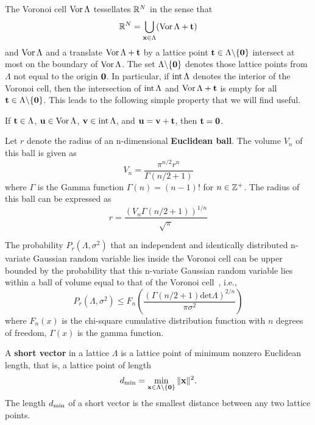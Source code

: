 The Voronoi cell $\operatorname{Vor}\Lambda$ tessellates ${\mathbb R}^N$ in the sense that
\[
{\mathbb R}^N = \bigcup_{\mathbf{x} \in \Lambda} (\operatorname{Vor}\Lambda + \mathbf{t})
\]
and $\operatorname{Vor}\Lambda$ and a translate $\operatorname{Vor}\Lambda + \mathbf{t}$ by a lattice point $\mathbf{t} \in \Lambda\backslash  \{\boldsymbol{0}\}$ intersect at most on the boundary of $\operatorname{Vor}\Lambda$.  The set $\Lambda \backslash  \{\boldsymbol{0}\}$ denotes those lattice points from $\Lambda$ not equal to the origin $\boldsymbol{0}$.  In particular, if $\operatorname{int}\Lambda$ denotes the interior of the Voronoi cell, then the intersection of $\operatorname{int}\Lambda$ and $\operatorname{Vor} \Lambda + \mathbf{t}$ is empty for all $\mathbf{t} \in \Lambda \backslash  \{\boldsymbol{0}\}$.  %
This leads to the following simple property that we will find useful.

\begin{remark}\label{remarksimpleintvor}
If $\mathbf{t} \in \Lambda$, $\mathbf{u} \in \operatorname{Vor}\Lambda$, $\mathbf{v} \in \operatorname{int}\Lambda$, and $\mathbf{u} = \mathbf{v} + \mathbf{t}$, then $\mathbf{t} = \boldsymbol{0}$.
\end{remark}


Let $r$ denote the radius of an n-dimensional \textbf{Euclidean ball}. The volume $V_n$ of this ball is given as
\[
V_n = \frac{\pi^{n/2}r^n}{\Gamma(n/2 + 1)} 
\]
where $\Gamma$ is the Gamma function $\Gamma(n)=(n-1)!$ for $n\in {\mathbb Z}^+$. The radius of this ball can be expressed as
\[
r =  \dfrac{\left (V_n \Gamma(n/2 + 1)\right)^{1/n}}{\sqrt{\pi}} 
\]

The probability $P_r(\Lambda, \sigma^2)$ that an independent and identically distributed n-variate Gaussian random variable lies inside the Voronoi cell can be upper bounded by the probability that this n-variate Gaussian random variable lies within a ball of volume equal to that of the Voronoi cell~\cite[Sec.~IV.C]{Hassibi_GPS_1998}, i.e.,
\begin{equation}\label{ch2:upperBoundUsingSphere}
P_r(\Lambda, \sigma^2) \leq F_n \left( \frac{ \left (  \Gamma(n/2 + 1)  \text{det}\Lambda  \right)^{2/n} } {\pi \sigma^2} \right)
\end{equation}
where $F_n(x)$ is the chi-square cumulative distribution function with $n$ degrees of freedom,  $\Gamma(x)$ is the gamma function.

A \textbf{short vector} in a lattice $\Lambda$ is a lattice point of minimum nonzero Euclidean length, that is, a lattice point of length
\[
d_{\text{min}} =  \min_{\mathbf{x} \in \Lambda \backslash \{ \boldsymbol{0} \} } \| \mathbf{x} \|^2.
\]   
The length $d_{\text{min}}$ of a short vector is the smallest distance between any two lattice points. 

